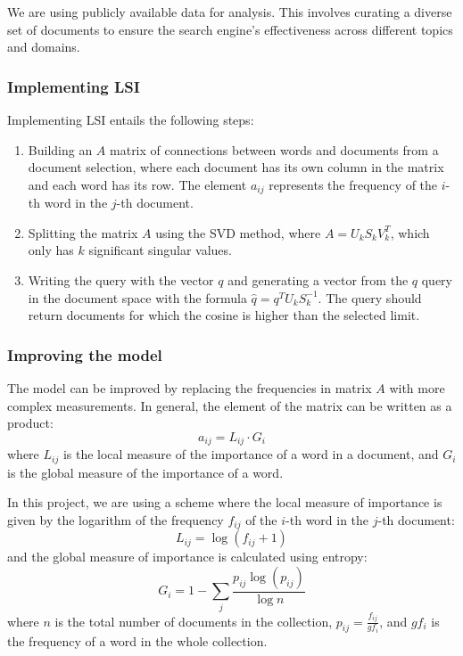 \documentclass[12pt,a4paper]{article}
\begin{document}
We are using publicly available data for analysis. This involves curating a diverse set of documents to ensure the search engine's effectiveness across different topics and domains.


\subsubsection{Implementing LSI}

Implementing LSI entails the following steps:

\begin{enumerate}
    \item Building an $A$ matrix of connections between words and documents from a document selection, where each document has its own column in the matrix and each word has its row. The element $a_{ij}$ represents the frequency of the $i$-th word in the $j$-th document.
    \item Splitting the matrix $A$ using the SVD method, where $A = U_k  S_k  V_k^T$, which only has $k$ significant singular values.
    \item Writing the query with the vector $q$ and generating a vector from the $q$ query in the document space with the formula $\hat{q} = q^T U_k S_k^{-1}$. The query should return documents for which the cosine is higher than the selected limit.
\end{enumerate}

\subsubsection{Improving the model}

The model can be improved by replacing the frequencies in matrix $A$ with more complex measurements. In general, the element of the matrix can be written as a product:
\[ a_{ij} = L_{ij} \cdot G_i \]
where $L_{ij}$ is the local measure of the importance of a word in a document, and $G_i$ is the global measure of the importance of a word.

\bigskip
\noindent In this project, we are using a scheme where the local measure of importance is given by the logarithm of the frequency $f_{ij}$ of the $i$-th word in the $j$-th document:
\[ L_{ij} = \log (f_{ij} +1) \]
and the global measure of importance is calculated using entropy:
\[ G_i = 1 - \sum_{j} \frac{p_{ij} \log (p_{ij})}{\log n} \]
where $n$ is the total number of documents in the collection, $p_{ij} = \frac{f_ {ij}}{g f_i}$, and $gf_i$ is the frequency of a word in the whole collection.
\end{document}
